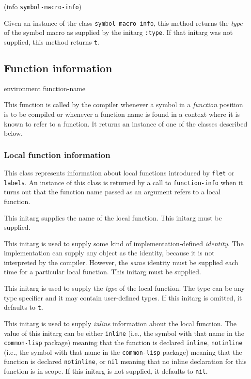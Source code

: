  {(info {\tt symbol-macro-info})}

Given an instance of the class \texttt{symbol-macro-info}, this method
returns the \emph{type} of the symbol macro as supplied by the initarg
\texttt{:type}.  If that initarg was not supplied, this method returns
\texttt{t}.

\subsection{Function information}

 {environment function-name}

This function is called by the compiler whenever a symbol in a
\emph{function} position is to be compiled or whenever a function name
is found in a context where it is known to refer to a function.  It
returns an instance of one of the classes described below.

\subsubsection{Local function information}


This class represents information about local functions introduced by
\texttt{flet} or \texttt{labels}.  An instance of this class is
returned by a call to \texttt{function-info} when it turns out that
the function name passed as an argument refers to a local function. 


This initarg supplies the name of the local function.  This initarg
must be supplied.


This initarg is used to supply some kind of implementation-defined 
\emph{identity}.  The implementation can supply any object as the
identity, because it is not interpreted by the compiler.  However, the
\emph{same} identity must be supplied each time for a particular
local function.  This initarg must be supplied. 


This initarg is used to supply the \emph{type} of the local function.
The type can be any type specifier and it may contain user-defined
types.  If this initarg is omitted, it defaults to \texttt{t}.


This initarg is used to supply \emph{inline} information about the
local function.  The value of this initarg can be either
\texttt{inline} (i.e., the symbol with that name in the
\texttt{common-lisp} package) meaning that the function is declared
\texttt{inline}, \texttt{notinline} (i.e., the symbol with that name
in the \texttt{common-lisp} package) meaning that the function is
declared \texttt{notinline}, or \texttt{nil} meaning that no inline
declaration for this function is in scope.  If this initarg is not
supplied, it defaults to \texttt{nil}.

